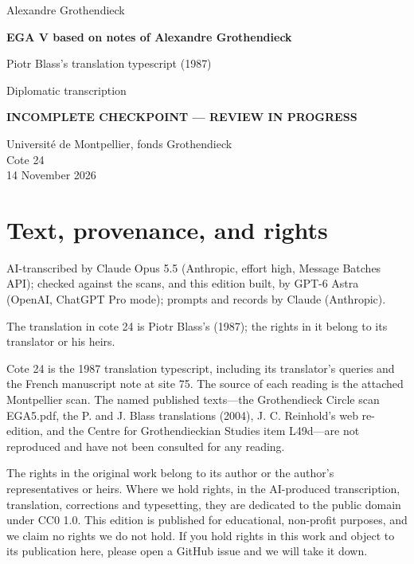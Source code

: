 \documentclass[10pt,a4paper]{article}
\newcommand{\EditionForm}{Diplomatic transcription}
\begin{document}
\hypersetup{pageanchor=false}\begin{titlepage}\thispagestyle{empty}\vspace*{20mm}
{\Large Alexandre Grothendieck\par}\vspace{12mm}
{\Huge\bfseries EGA V based on notes of Alexandre Grothendieck\par}\vspace{8mm}
{\Large Piotr Blass's translation typescript (1987)\par}\vspace{7mm}
{\large\EditionForm\par}\vspace{12mm}
{\large\bfseries\color{deletedred}INCOMPLETE CHECKPOINT — REVIEW IN PROGRESS\par}\vspace{10mm}
Université de Montpellier, fonds Grothendieck\\ Cote 24\\
14 November 2026
\vfill\end{titlepage}\clearpage\hypersetup{pageanchor=true}
\section*{Text, provenance, and rights}
AI-transcribed by Claude Opus 5.5 (Anthropic, effort high, Message Batches API); checked against the scans, and this edition built, by GPT-6 Astra (OpenAI, ChatGPT Pro mode); prompts and records by Claude (Anthropic).

The translation in cote 24 is Piotr Blass's (1987); the rights in it belong to its translator or his heirs.

Cote 24 is the 1987 translation typescript, including its translator's queries and the French manuscript note at site 75. The source of each reading is the attached Montpellier scan. The named published texts---the Grothendieck Circle scan EGA5.pdf, the P. and J. Blass translations (2004), J. C. Reinhold's web re-edition, and the Centre for Grothendieckian Studies item L49d---are not reproduced and have not been consulted for any reading.

The rights in the original work belong to its author or the author's representatives or heirs. Where we hold rights, in the AI-produced transcription, translation, corrections and typesetting, they are dedicated to the public domain under CC0 1.0. This edition is published for educational, non-profit purposes, and we claim no rights we do not hold. If you hold rights in this work and object to its publication here, please open a GitHub issue and we will take it down.
\end{document}
